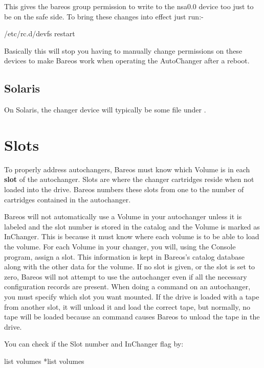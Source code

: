 This gives the bareos group permission to write to the nsa0.0 device
too just to be on the safe side.   To bring these changes into effect
just run:-

\begin{commands}{}
/etc/rc.d/devfs restart
\end{commands}

Basically this will stop you having to manually change permissions on these
devices to make Bareos work when operating the AutoChanger after a reboot.

\subsection{Solaris}

On Solaris, the changer device will typically be some file under .



\section{Slots}
\label{Slots}

To properly address autochangers, Bareos must know which Volume is in each
{\bf slot} of the autochanger. Slots are where the changer cartridges reside
when not loaded into the drive. Bareos numbers these slots from one to the
number of cartridges contained in the autochanger.

Bareos will not automatically use a Volume in your autochanger unless it is
labeled and the slot number is stored in the catalog and the Volume is marked
as InChanger. This is because it must know where each volume is to
be able to load the volume.
For each Volume in your
changer, you will, using the Console program, assign a slot. This information
is kept in Bareos's catalog database along with the other data for the
volume. If no slot is given, or the slot is set to zero, Bareos will not
attempt to use the autochanger even if all the necessary configuration records
are present. When doing a  command on an autochanger, you must
specify which slot you want mounted.  If the drive is loaded with a tape
from another slot, it will unload it and load the correct tape, but
normally, no tape will be loaded because an  command causes
Bareos to unload the tape in the drive.


You can check if the Slot number and InChanger flag by:
\begin{bconsole}{list volumes}
*list volumes
\end{bconsole}



